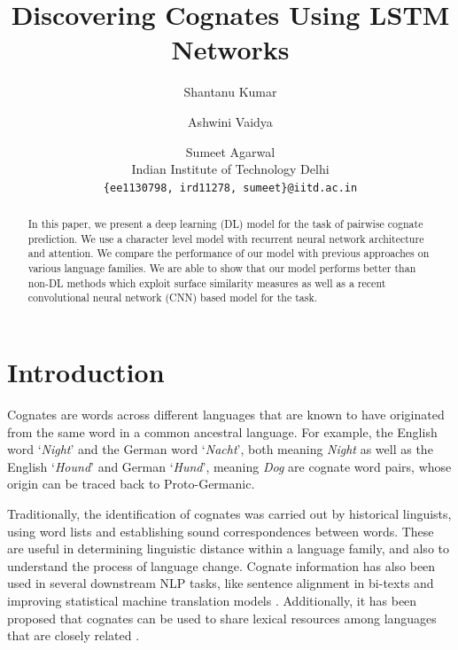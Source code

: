 \documentclass[11pt,letterpaper]{article}
\title{Discovering Cognates Using LSTM Networks}
\author{Shantanu Kumar \and Ashwini Vaidya \and Sumeet Agarwal \\ 
  Indian Institute of Technology Delhi
  \\ {\tt \{ee1130798, ird11278, sumeet\}@iitd.ac.in}}
\date{}
\begin{document}
\maketitle

\begin{abstract}
In this paper, we present a deep learning (DL) model for the task of pairwise cognate prediction. We use a character level model with recurrent neural network architecture and attention. We compare the performance of our model with previous approaches on various language families. We are able to show that our model performs better than non-DL methods which exploit surface similarity measures as well as a recent convolutional neural network (CNN) based model for the task.
\end{abstract}

\section{Introduction}
Cognates are words across different languages that are known to have originated from the same word in a common ancestral language. For example, the English word `\textit{Night}' and the German word `\textit{Nacht}', both meaning \textit{Night} as well as the English `\textit{Hound}' and German `\textit{Hund}', meaning \textit{Dog} are cognate word pairs, whose origin can be traced back to Proto-Germanic.

Traditionally, the identification of cognates was carried out by historical linguists, using word lists and establishing sound correspondences between words. These are useful in determining linguistic distance within a language family, and also to understand the process of language change. Cognate information has also been used in several downstream NLP tasks, like sentence alignment in bi-texts \cite{simard1993using} and improving statistical machine translation models \cite{kondrak2003cognates}. Additionally, it has been proposed that cognates can be used to share lexical resources among languages that are closely related \cite{Singh:07b}.
\end{document}
